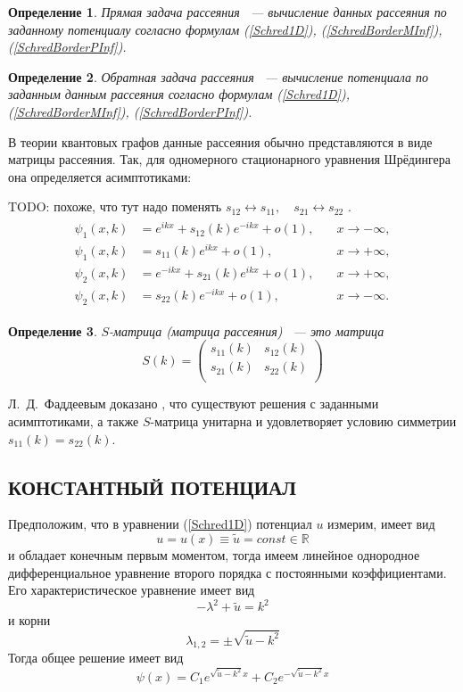 \documentclass[a4 paper, 12 pt]{extarticle}
\newtheorem{Def}{Определение}[section]
\begin{document}
   \begin{Def}
   	Прямая задача рассеяния ~--- вычисление данных рассеяния по заданному потенциалу согласно формулам (\ref{Schred1D}), (\ref{SchredBorderMInf}), (\ref{SchredBorderPInf}).
   \end{Def}

   \begin{Def}
   	Обратная задача рассеяния ~--- вычисление потенциала по заданным данным рассеяния согласно формулам (\ref{Schred1D}), (\ref{SchredBorderMInf}), (\ref{SchredBorderPInf}).
   \end{Def}

   В теории квантовых графов данные рассеяния обычно представляются в виде матрицы рассеяния. Так, для одномерного стационарного уравнения Шрёдингера она определяется асимптотиками:
   
   TODO: похоже, что тут надо поменять $s_{12} \leftrightarrow s_{11}, \quad s_{21} \leftrightarrow s_{22}$ .
   \begin{gather*}
   \begin{aligned}
   \psi_1(x,k)&=e^{ikx}+s_{12}(k)e^{-ikx}+o(1), \quad &x\rightarrow-\infty,\\
   \psi_1(x,k)&=s_{11}(k)e^{ikx}+o(1), \quad &x\rightarrow+\infty,\\
   \psi_2(x,k)&=e^{-ikx}+s_{21}(k)e^{ikx}+o(1), \quad &x\rightarrow+\infty,\\
   \psi_2(x,k)&=s_{22}(k)e^{-ikx}+o(1), \quad &x\rightarrow-\infty.
   \end{aligned}
   \end{gather*}
   

   \begin{Def}
   	$S$-матрица (матрица рассеяния) ~--- это матрица 
    \begin{equation}\label{DSM}
    S(k)=\left(%
    \begin{array}{cc}
    s_{11}(k) & s_{12}(k) \\
    s_{21}(k) & s_{22}(k) \\
    \end{array}%
    \right)
    \end{equation}
   \end{Def}

   Л.~Д.~Фаддеевым доказано \cite{SMatrix}, что существуют решения с заданными асимптотиками, а также $S$-матрица унитарна и удовлетворяет условию симметрии $s_{11}\left(k\right) = s_{22}\left(k\right)$.
   
   \subsection{КОНСТАНТНЫЙ ПОТЕНЦИАЛ}
   Предположим, что в уравнении (\ref{Schred1D}) потенциал $u$ измерим, имеет вид $$u = u\left(x\right) \equiv \tilde{u} = const \in \mathbb{R}$$ и обладает конечным первым моментом, тогда имеем линейное однородное дифференциальное уравнение второго порядка с постоянными коэффициентами. Его характеристическое уравнение имеет вид
   \[-\lambda^2+\tilde{u} = k^2\]
   и корни
   \[\lambda_{1,2}=\pm \sqrt{\tilde{u}-k^2}\]
   Тогда общее решение имеет вид
   \[
   \psi\left(x\right)= C_1 e^{\sqrt{\tilde{u}-k^2}x} + C_2 e^{-\sqrt{\tilde{u}-k^2}x}
   \]
   
\end{document}
